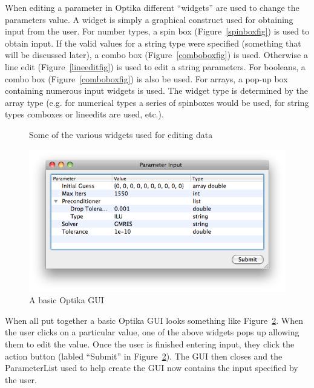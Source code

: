 When editing a parameter in Optika different ``widgets'' are used to change the parameters value. A widget is simply
a graphical construct used for obtaining input from the user. For number types, a spin box (Figure~\ref{spinboxfig}) is used to obtain input. 
If the valid values for a string type were specified (something that will be discussed later), a combo box (Figure~\ref{comboboxfig}) is used.
Otherwise a line edit (Figure~\ref{lineeditfig}) is used to edit a string parameters. For booleans, a combo box (Figure~\ref{comboboxfig}) 
is also be used. For arrays, a pop-up box containing numerous input widgets is used. The widget type is determined by the
array type (e.g. for numerical types a series of spinboxes would be used, for string types comboxes or lineedits are used, etc.). 
	\begin{figure}
		\centering
		\caption{Some of the various widgets used for editing data~\cite{QtGallery}}
		\label{editingWidgets}
	\end{figure}
  \begin{figure}
  \centering
  \includegraphics[scale=0.5]{graphics/basic_example}
  \caption[Basic GUI]{A basic Optika GUI}
  \label{basicexample}
  \end{figure} 
When all put together a basic Optika GUI looks something like Figure~\ref{basicexample}.
When the user clicks on a particular value, one of the above widgets pops up allowing them to edit the value.
Once the user is finished entering input, they click the action button (labled ``Submit'' in Figure~\ref{basicexample}).
The GUI then closes and the ParameterList used to help create the GUI now contains the input specified by the user.

